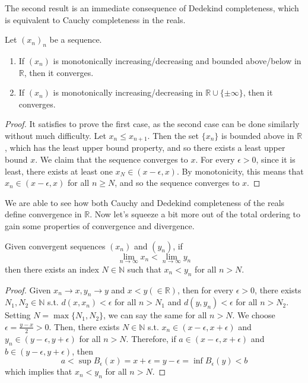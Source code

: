   The second result is an immediate consequence of Dedekind completeness, which is equivalent to Cauchy completeness in the reals.  

  \begin{theorem}
    \label{thm:monotone-convergence}
    Let $(x_n)_n$ be a sequence. 
    \begin{enumerate}
      \item If $(x_n)$ is monotonically increasing/decreasing and bounded above/below in $\mathbb{R}$, then it converges. 
      \item If $(x_n)$ is monotonically increasing/decreasing in $\mathbb{R} \cup \{\pm \infty\}$, then it converges. 
    \end{enumerate}
  \end{theorem}
  \begin{proof}
    It satisfies to prove the first case, as the second case can be done similarly without much difficulty. Let $x_n \leq x_{n+1}$. Then the set $\{x_n\}$ is bounded above in $\mathbb{R}$, which has the least upper bound property, and so there exists a least upper bound $x$. We claim that the sequence converges to $x$. For every $\epsilon > 0$, since it is least, there exists at least one $x_N \in (x - \epsilon, x)$. By monotonicity, this means that $x_n \in (x - \epsilon, x)$ for all $n \geq N$, and so the sequence converges to $x$. 
  \end{proof}

  We are able to see how both Cauchy and Dedekind completeness of the reals define convergence in $\mathbb{R}$. Now let's squeeze a bit more out of the total ordering to gain some properties of convergence and divergence.   
  
  \begin{theorem}
    Given convergent sequences $(x_n)$ and $(y_n)$, if 
    \begin{equation}
      \lim_{n \rightarrow \infty} x_n < \lim_{n \rightarrow \infty} y_n
    \end{equation}
    then there exists an index $N \in \mathbb{N}$ such that $x_n < y_n$ for all $n > N$. 
  \end{theorem}
  \begin{proof}
    Given $x_n \rightarrow x, y_n \rightarrow y$ and $x < y (\in \mathbb{R})$, then for every $\epsilon > 0$, there exists $N_1, N_2 \in \mathbb{N}$ s.t. $d(x, x_n) < \epsilon$ for all $n > N_1$ and $d(y, y_n) < \epsilon$ for all $n > N_2$. Setting $N = \max\{N_1, N_2\}$, we can say the same for all $n > N$. We choose $\epsilon = \frac{y - x}{2} > 0$. Then, there exists $N \in \mathbb{N}$ s.t. $x_n \in (x - \epsilon, x + \epsilon)$ and $y_n \in (y - \epsilon, y + \epsilon)$ for all $n > N$. Therefore, if $a \in (x - \epsilon, x + \epsilon)$ and $b \in (y - \epsilon, y + \epsilon)$, then 
    \begin{equation}
      a < \sup B_\epsilon (x) = x + \epsilon = y - \epsilon = \inf B_\epsilon (y) < b
    \end{equation}
    which implies that $x_n < y_n$ for all $n > N$. 
  \end{proof}

